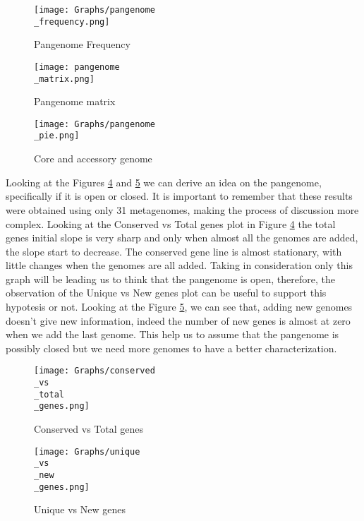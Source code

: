 \documentclass[a4paper,titlepage, oneside]{book}
\begin{document}
\begin{figure}[ht]
\centering
\texttt{[image: Graphs/pangenome\\\_frequency.png]}
\caption{Pangenome Frequency}
\label{fig:pangenome2}
\end{figure}

\begin{figure}[ht]
\centering
\texttt{[image: pangenome\\\_matrix.png]}
\caption{Pangenome matrix}
\label{fig:pangenome1}
\end{figure}

\begin{figure}[ht]
\centering
\texttt{[image: Graphs/pangenome\\\_pie.png]}
\caption{Core and accessory genome}
\label{fig:pangenome5}
\end{figure}


Looking at the Figures \ref{fig:pangenome3} and  \ref{fig:pangenome4} we can derive an idea on the pangenome, specifically if it is open or closed. It is important to remember that these results were obtained using only 31 metagenomes, making the process of discussion more complex. Looking at the Conserved vs Total genes plot in Figure \ref{fig:pangenome3} the total genes initial slope is very sharp and only when almost all the genomes are added, the slope start to decrease. The conserved gene line is almost stationary, with little changes when the genomes are all added. Taking in consideration only this graph will be leading us to think that the pangenome is open, therefore, the observation of the Unique vs New genes plot can be useful to support this hypotesis or not. Looking at the Figure \ref{fig:pangenome4}, we can see that, adding new genomes doesn't give new information, indeed the number of new genes is almost at zero when we add the last genome. This help us to assume that the pangenome is possibly closed but we need more genomes to have a better characterization.


\begin{figure}[ht]
\centering
\texttt{[image: Graphs/conserved\\\_vs\\\_total\\\_genes.png]}
\caption{Conserved vs Total genes}
\label{fig:pangenome3}
\end{figure}

\begin{figure}[ht]
\centering
\texttt{[image: Graphs/unique\\\_vs\\\_new\\\_genes.png]}
\caption{Unique vs New genes}
\label{fig:pangenome4}
\end{figure}
\end{document}

